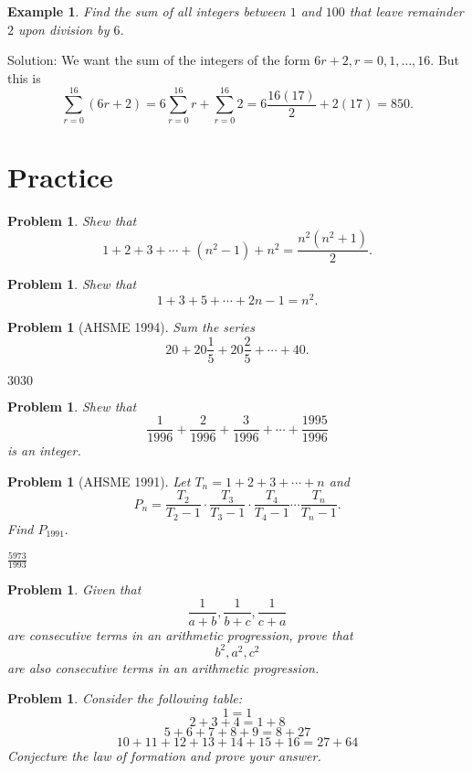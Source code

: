 \documentclass[11pt, openany]{book}
\theoremstyle{change} \theoremheaderfont{\blue\sffamily\bfseries}
\newtheorem{exa}[thm]{Example}
\newtheorem{pro}[thm]{Problem}
\theoremstyle{nonumberplain} \theoremheaderfont{\sffamily\bfseries}
\newcommand{\í}{\'{\i}}
\begin{document}
\begin{exa}
Find the sum of all integers between $1$ and $100$ that leave
remainder $2$ upon division by $6$.
\end{exa}
Solution: We want the sum of the integers of the form $6r + 2, r =
0, 1, \ldots , 16.$ But this is
$$\sum _{r = 0} ^{16}(6r + 2) = 6\sum _{r = 0} ^{16} r + \sum _{r = 0} ^{16}2 = 6\frac{16(17)}{2} + 2(17)
= 850.$$
\section*{Practice}\begin{multicols}{2}\columnseprule 1pt \columnsep 25pt

\begin{pro} Shew that
$$ 1 + 2 + 3 + \cdots + (n^2 - 1) + n^2 = \frac{n^2(n^2 + 1)}{2}.$$\end{pro}
\begin{pro} Shew that
$$1 + 3 + 5 + \cdots + 2n - 1 = n^2.$$\end{pro}
\begin{pro}[AHSME 1994] Sum the series
$$20 + 20\frac{1}{5} + 20\frac{2}{5} + \cdots + 40.$$
\begin{answer}
$ 3030$
\end{answer}
\end{pro}
\begin{pro}
Shew that $$\frac{1}{1996} + \frac{2}{1996} + \frac{3}{1996} +
\cdots + \frac{1995}{1996} $$ is an integer.
\end{pro}
\begin{pro}[AHSME 1991] Let $T_n = 1 + 2 + 3 + \cdots  + n$ and
$$P_n = \frac{T_2}{T_2 - 1}\cdot\frac{T_3}{T_3 - 1}\cdot\frac{T_4}{T_4 - 1}\cdots \frac{T_n}{T_n - 1}.$$
Find $P_{1991}.$
\begin{answer}
$\frac{5973}{1993}$
\end{answer}
\end{pro}
\begin{pro}
Given that
$$\frac{1}{a + b}, \frac{1}{b + c}, \frac{1}{c + a}$$are consecutive terms in an arithmetic progression, prove that
$$b^2, a^2, c^2$$are also consecutive terms in an arithmetic progression.
\end{pro}
\begin{pro} Consider the following table:
$$1 = 1$$
$$2 + 3 + 4 = 1 + 8$$
$$ 5 + 6 + 7 + 8 + 9 = 8 + 27$$
$$10 + 11 + 12 + 13 + 14 + 15 + 16 = 27 + 64$$
Conjecture the law of formation and prove your answer.\end{pro}

\end{multicols}
\end{document}

